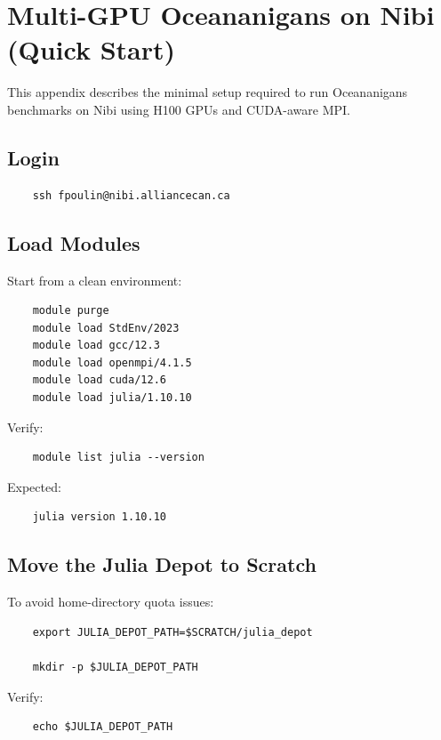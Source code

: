 \section{Multi-GPU Oceananigans on Nibi (Quick Start)} 

This appendix describes the minimal setup required to run Oceananigans benchmarks on Nibi using H100 GPUs and CUDA-aware MPI. 

\subsection{Login} 

\begin{verbatim} 
    ssh fpoulin@nibi.alliancecan.ca 
\end{verbatim} 

\subsection{Load Modules} 

Start from a clean environment: 

\begin{verbatim} 
    module purge 
    module load StdEnv/2023 
    module load gcc/12.3 
    module load openmpi/4.1.5 
    module load cuda/12.6 
    module load julia/1.10.10 
\end{verbatim} 

Verify: 

\begin{verbatim} 
    module list julia --version 
\end{verbatim} 

Expected: 

\begin{verbatim} 
    julia version 1.10.10 
\end{verbatim} 

\subsection{Move the Julia Depot to Scratch} 

To avoid home-directory quota issues: 

\begin{verbatim} 
    export JULIA_DEPOT_PATH=$SCRATCH/julia_depot 
    
    mkdir -p $JULIA_DEPOT_PATH 
\end{verbatim} 

Verify: 

\begin{verbatim} 
    echo $JULIA_DEPOT_PATH 
\end{verbatim} 

